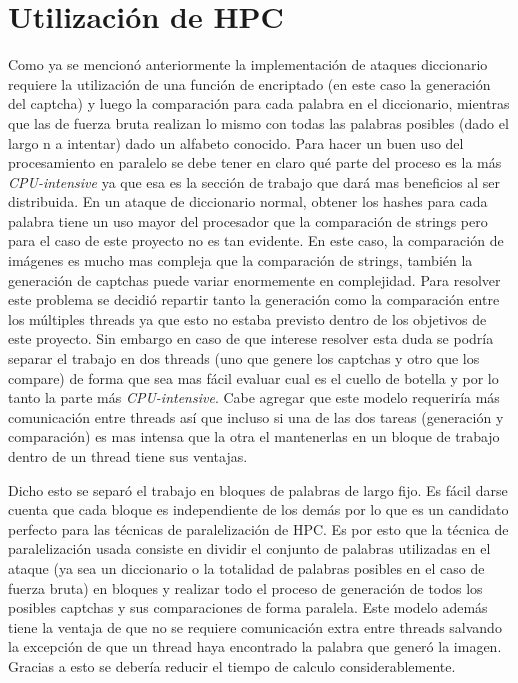 \documentclass[conference]{IEEEtran}
\begin{document}
\section{Utilización de HPC}
Como ya se mencionó anteriormente la implementación de ataques diccionario requiere la utilización de una función de encriptado (en este caso la generación del captcha) y luego la comparación para cada palabra en el diccionario, mientras que las de fuerza bruta realizan lo mismo con todas las palabras posibles (dado el largo n a intentar) dado un alfabeto conocido. Para hacer un buen uso del procesamiento en paralelo se debe tener en claro qué parte del proceso es la más \textit{CPU-intensive} ya que esa es la sección de trabajo que dará mas beneficios al ser distribuida. En un ataque de diccionario normal, obtener los hashes para cada palabra tiene un uso mayor del procesador que la comparación de strings pero para el caso de este proyecto no es tan evidente. En este caso, la comparación de imágenes es mucho mas compleja que la comparación de strings, también la generación de captchas puede variar enormemente en complejidad. Para resolver este problema se decidió repartir tanto la generación como la comparación entre los múltiples threads ya que esto no estaba previsto dentro de los objetivos de este proyecto. Sin embargo en caso de que interese resolver esta duda se podría separar el trabajo en dos threads (uno que genere los captchas y otro que los compare) de forma que sea mas fácil evaluar cual es el cuello de botella y por lo tanto la parte más \textit{CPU-intensive}. Cabe agregar que este modelo requeriría más comunicación entre threads así que incluso si una de las dos tareas (generación y comparación) es mas intensa que la otra el mantenerlas en un bloque de trabajo dentro de un thread tiene sus ventajas.\newline

Dicho esto se separó el trabajo en bloques de palabras de largo fijo. Es fácil darse cuenta que cada bloque es independiente de los demás por lo que es un candidato perfecto para las técnicas de paralelización de HPC. 
Es por esto que la técnica de paralelización usada consiste en dividir el conjunto de palabras utilizadas en el ataque (ya sea un diccionario o la totalidad de palabras posibles en el caso de fuerza bruta) en bloques y realizar todo el proceso de generación de todos los posibles captchas y sus comparaciones de forma paralela.
Este modelo además tiene la ventaja de que no se requiere comunicación extra entre threads salvando la excepción de que un thread haya encontrado la palabra que generó la imagen. Gracias a esto se debería reducir el tiempo de calculo considerablemente.
\end{document}
